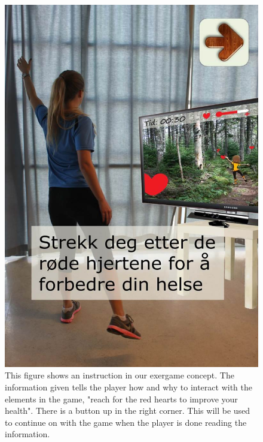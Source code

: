 \begin{figure} [H]
\centering
\includegraphics[scale=0.7]{KineIntro.jpg}
\caption[Instruction]{This figure shows an instruction in our exergame concept. The information given tells the player how and why to interact with the elements in the game, "reach for the red hearts to improve your health". There is a button up in the right corner. This will be used to continue on with the game when the player is done reading the information.}
\label{fig:kineintro}
\end{figure}


